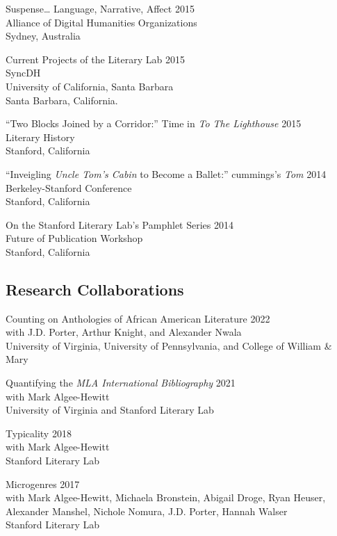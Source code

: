 \documentclass[
  12pt,
  letterpaper,
]{article}
\begin{document}
Suspense\ldots{} Language, Narrative, Affect \hfill 2015\\
Alliance of Digital Humanities Organizations\\
Sydney, Australia

Current Projects of the Literary Lab \hfill 2015\\
SyncDH\\
University of California, Santa Barbara\\
Santa Barbara, California.

``Two Blocks Joined by a Corridor:'' Time in \emph{To The Lighthouse} \hfill 2015\\
Literary History\\
Stanford, California

``Inveigling \emph{Uncle Tom's Cabin} to Become a Ballet:'' cummings's
\emph{Tom} \hfill 2014\\
Berkeley-Stanford Conference\\
Stanford, California

On the Stanford Literary Lab's Pamphlet Series \hfill 2014\\
Future of Publication Workshop\\
Stanford, California

\hypertarget{research-collaborations}{%
\subsection{Research Collaborations}\label{research-collaborations}}

Counting on Anthologies of African American Literature \hfill 2022\\
with J.D. Porter, Arthur Knight, and Alexander Nwala\\
University of Virginia, University of Pennsylvania, and College of William \& Mary

Quantifying the \emph{MLA International Bibliography} \hfill 2021\\
with Mark Algee-Hewitt\\
University of Virginia and Stanford Literary Lab

Typicality \hfill 2018\\
with Mark Algee-Hewitt\\
Stanford Literary Lab

Microgenres \hfill 2017\\
with Mark Algee-Hewitt, Michaela Bronstein, Abigail
Droge, Ryan Heuser,\\
Alexander Manshel, Nichole Nomura, J.D. Porter, Hannah
Walser\\
Stanford Literary Lab
\end{document}

